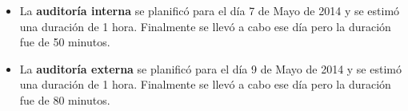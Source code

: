 \begin{itemize}
	\item La \textbf{auditoría interna} se planificó para el día 7 de Mayo de 2014 y se estimó una duración de 1 hora. Finalmente se llevó a cabo ese día pero la duración fue de 50 minutos.
	\item La \textbf{auditoría externa} se planificó para el día 9 de Mayo de 2014 y se estimó una duración de 1 hora. Finalmente se llevó a cabo ese día pero la duración fue de 80 minutos.
\end{itemize}